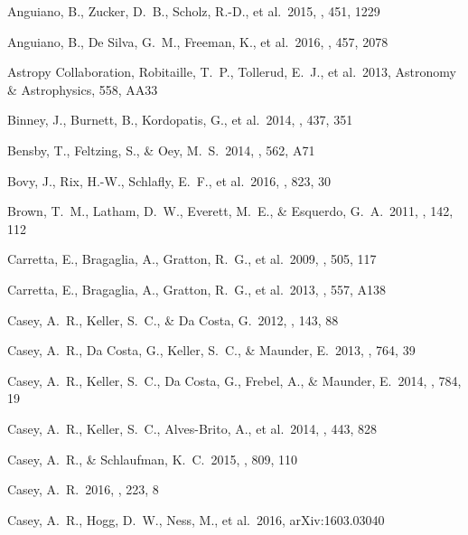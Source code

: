 \documentclass[preprint,trackchanges]{aastex}
\begin{document}
\begin{thebibliography}{dummy}
 Anguiano, B., Zucker, D.~B., Scholz, R.-D., et al.\ 2015, \mnras, 451, 1229 

 Anguiano, B., De Silva, G.~M., Freeman, K., et al.\ 2016, \mnras, 457, 2078 

 Astropy Collaboration, Robitaille, T.~P., Tollerud, E.~J., et al.\ 2013, Astronomy \& Astrophysics, 558, AA33

 Binney, J., Burnett, B., Kordopatis, G., et al.\ 2014, \mnras, 437, 351 

 Bensby, T., Feltzing, S., \& Oey, M.~S.\ 2014, \aap, 562, A71 

 Bovy, J., Rix, H.-W., Schlafly, E.~F., et al.\ 2016, \apj, 823, 30 

 Brown, T.~M., Latham, D.~W., Everett, M.~E., \& Esquerdo, G.~A.\ 2011, \aj, 142, 112 

 Carretta, E., Bragaglia, A., Gratton, R.~G., et al.\ 2009, \aap, 505, 117 

 Carretta, E., Bragaglia, A., Gratton, R.~G., et al.\ 2013, \aap, 557, A138 

 Casey, A.~R., Keller, S.~C., \& Da Costa, G.\ 2012, \aj, 143, 88 

 Casey, A.~R., Da Costa, G., Keller, S.~C., \& Maunder, E.\ 2013, \apj, 764, 39 

 Casey, A.~R., Keller, S.~C., Da Costa, G., Frebel, A., \& Maunder, E.\ 2014, \apj, 784, 19 

 Casey, A.~R., Keller, S.~C., Alves-Brito, A., et al.\ 2014, \mnras, 443, 828 

 Casey, A.~R., \& Schlaufman, K.~C.\ 2015, \apj, 809, 110 

 Casey, A.~R.\ 2016, \apjs, 223, 8 

 Casey, A.~R., Hogg, D.~W., Ness, M., et al.\ 2016, arXiv:1603.03040 


\end{thebibliography}
\end{document}
